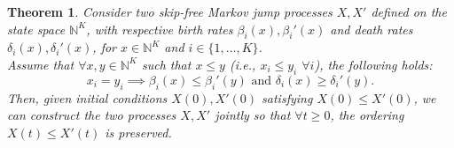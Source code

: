 \documentclass[11pt]{article}
\newtheorem{theorem}{Theorem}[section]
\begin{document}
\begin{theorem} \label{thm:coupling}
Consider two skip-free Markov jump processes $X,X'$ defined on the state space $\mathbb{N}^K$, with respective birth rates $\beta_i(x),\beta_i'(x)$ and death rates $\delta_i(x),\delta_i'(x)$, for $x\in \mathbb{N}^K$ and $i\in \{1,\ldots,K\}$.\\
Assume that $\forall x,y\in \mathbb{N}^K$ such that $x\leq y$ (i.e., $x_i\leq y_i$ $\forall i$), the following holds:
\begin{equation} \label{eqn:coupling_condition}
x_i = y_i \implies \beta_i(x) \leq \beta_i'(y) \text{ and } \delta_i(x) \geq \delta_i'(y).
\end{equation}
Then, given initial conditions $X(0),X'(0)$ satisfying $X(0)\leq X'(0)$, we can construct the two processes $X,X'$ jointly so that $\forall t\geq 0$, the ordering $X(t)\leq X'(t)$ is preserved.
\end{theorem}
\end{document}
